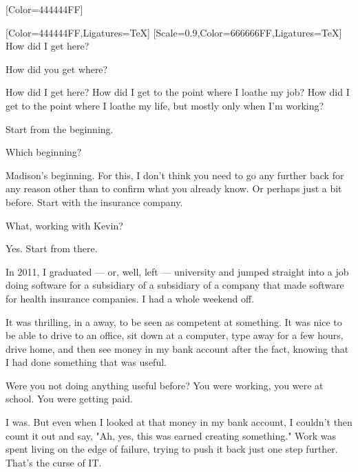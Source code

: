 \label{burnout}
\renewcommand*{\footnoterule}{%
  \kern-3pt%
  \color[HTML]{444444}\hrule width 0.4\columnwidth
  \kern2.6pt}
\renewfontfamily{}[Color=444444FF]
\begin{paracol}{2}
  \begin{leftcolumn}
    [Color=444444FF,Ligatures=TeX]
    \renewfontfamily{}[Scale=0.9,Color=666666FF,Ligatures=TeX]
\noindent How did I get here?

\begin{ally}
How did you get where?
\end{ally}
How did I get here? How did I get to the point where I loathe my job? How did I get to the point where I loathe my life, but mostly only when I'm working?

\begin{ally}
Start from the beginning.
\end{ally}
Which beginning?

\begin{ally}
Madison's beginning. For this, I don't think you need to go any further back for any reason other than to confirm what you already know. Or perhaps just a bit before. Start with the insurance company.
\end{ally}
What, working with Kevin?

\begin{ally}
Yes. Start from there.
\end{ally}
In 2011, I graduated --- or, well, left --- university and jumped straight into a job doing software for a subsidiary of a subsidiary of a company that made software for health insurance companies. I had a whole weekend off.

It was thrilling, in a away, to be seen as competent at something. It was nice to be able to drive to an office, sit down at a computer, type away for a few hours, drive home, and then see money in my bank account after the fact, knowing that I had done something that was useful.

\begin{ally}
Were you not doing anything useful before? You were working, you were at school. You were getting paid.
\end{ally}
I was. But even when I looked at that money in my bank account, I couldn't then count it out and say, "Ah, yes, this was earned creating something." Work was spent living on the edge of failure, trying to push it back just one step further. That's the curse of IT.


\end{leftcolumn}
\end{paracol}
